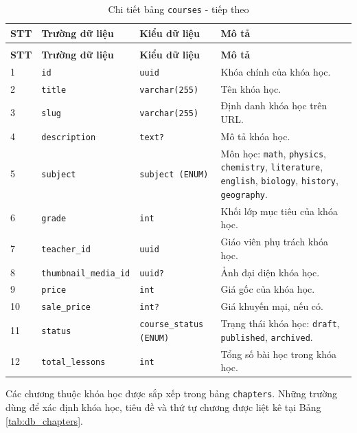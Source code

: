 \documentclass[../DoAn.tex]{subfiles}
\begin{document}
{\begin{longtable}{|p{}|p{}|p{}|p{}|}
\caption{Chi tiết bảng \texttt{courses}}
\label{tab:db_courses}\\
\hline
\textbf{STT} & \textbf{Trường dữ liệu} & \textbf{Kiểu dữ liệu} & \textbf{Mô tả} \\ \hline
\endfirsthead
\caption[]{Chi tiết bảng \texttt{courses} - tiếp theo}\\
\hline
\textbf{STT} & \textbf{Trường dữ liệu} & \textbf{Kiểu dữ liệu} & \textbf{Mô tả} \\ \hline
\endhead
1 & \texttt{id} & \texttt{uuid} & Khóa chính của khóa học. \\ \hline
2 & \texttt{title} & \texttt{varchar(255)} & Tên khóa học. \\ \hline
3 & \texttt{slug} & \texttt{varchar(255)} & Định danh khóa học trên URL. \\ \hline
4 & \texttt{description} & \texttt{text?} & Mô tả khóa học. \\ \hline
5 & \texttt{subject} & \texttt{subject (ENUM)} & Môn học: \texttt{math}, \texttt{physics}, \texttt{chemistry}, \texttt{literature}, \texttt{english}, \texttt{biology}, \texttt{history}, \texttt{geography}. \\ \hline
6 & \texttt{grade} & \texttt{int} & Khối lớp mục tiêu của khóa học. \\ \hline
7 & \texttt{teacher\_id} & \texttt{uuid} & Giáo viên phụ trách khóa học. \\ \hline
8 & \texttt{thumbnail\_media\_id} & \texttt{uuid?} & Ảnh đại diện khóa học. \\ \hline
9 & \texttt{price} & \texttt{int} & Giá gốc của khóa học. \\ \hline
10 & \texttt{sale\_price} & \texttt{int?} & Giá khuyến mại, nếu có. \\ \hline
11 & \texttt{status} & \texttt{course\_status (ENUM)} & Trạng thái khóa học: \texttt{draft}, \texttt{published}, \texttt{archived}. \\ \hline
12 & \texttt{total\_lessons} & \texttt{int} & Tổng số bài học trong khóa học. \\ \hline
\end{longtable}

Các chương thuộc khóa học được sắp xếp trong bảng \texttt{chapters}. Những trường dùng để xác định khóa học, tiêu đề và thứ tự chương được liệt kê tại Bảng \ref{tab:db_chapters}.

}
\end{document}
